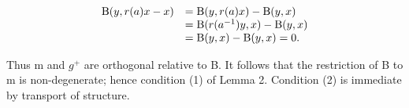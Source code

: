 \[
\begin{array}{r l} \mathrm{B} (y, r (a) x - x) & = \mathrm{B} (y, r (a) x) - \mathrm{B} (y, x) \\ & = \mathrm{B} (r (a ^ {- 1}) y, x) - \mathrm{B} (y, x) \\ & = \mathrm{B} (y, x) - \mathrm{B} (y, x) = 0. \end{array}
\]

Thus m and \(g^{+}\) are orthogonal relative to B. It follows that the restriction of B to m is non-degenerate; hence condition (1) of Lemma 2. Condition (2) is immediate by transport of structure.

